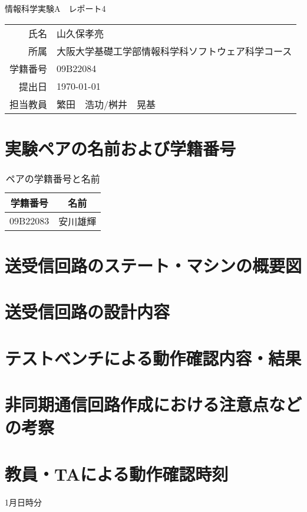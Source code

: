 \documentclass[dvipdfmx]{jarticle}
\begin{document}
\begin{titlepage}
    \begin{center}
        {\huge 情報科学実験A　レポート4}
        \vspace{180pt}\\
        \begin{tabular}{rl}
            氏名 & 山久保孝亮\\
            所属 & 大阪大学基礎工学部情報科学科ソフトウェア科学コース\\
            学籍番号 & 09B22084\\
            提出日 & \today\\
            担当教員 & 繁田　浩功/桝井　晃基
        \end{tabular}
    \end{center}
\end{titlepage}
\section{実験ペアの名前および学籍番号}
\begin{table}[h]
    \centering
    \begin{tabular}{|c|c|}
        \hline
        学籍番号 & 名前\\\hline\hline
        09B22083 & 安川雄輝\\\hline
    \end{tabular}
    \caption{ペアの学籍番号と名前}
\end{table}
\section{送受信回路のステート・マシンの概要図}
\section{送受信回路の設計内容}
\section{テストベンチによる動作確認内容・結果}
\section{非同期通信回路作成における注意点などの考察}
\section{教員・TAによる動作確認時刻}
1月日時分
\end{document}
